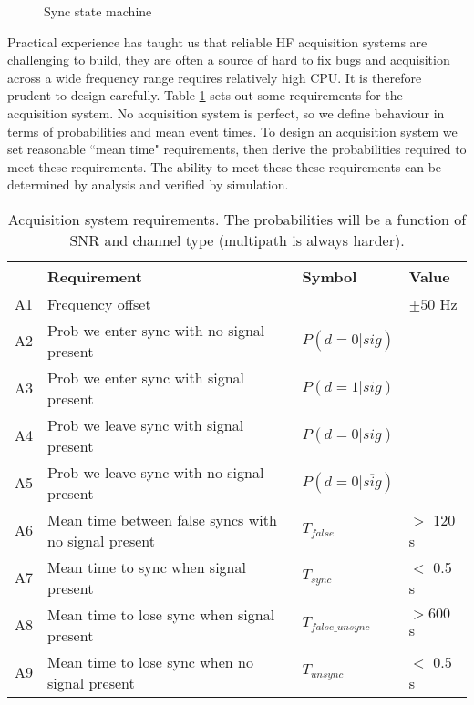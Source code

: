 \documentclass{article}
\begin{document}
\begin{figure} [H]
\caption{Sync state machine}
\vspace{5mm}
\label{fig:sync_state_mach}
\begin{center}
\end{center}
\end{figure}

Practical experience has taught us that reliable HF acquisition systems are challenging to build, they are often a source of hard to fix bugs and acquisition across a wide frequency range requires relatively high CPU.  It is therefore prudent to design carefully.  Table \ref{tab:acq_req} sets out some requirements for the acquisition system. No acquisition system is perfect, so we define behaviour in terms of probabilities and mean event times.  To design an acquisition system we set reasonable ``mean time" requirements, then derive the probabilities required to meet these requirements.  The ability to meet these these requirements can be determined by analysis and verified by simulation.

\begin{table} [H]
\centering
\begin{tabular}{ m{0.3cm} | m{6.5cm} | m{2.1cm} | m{1.25cm}}
 \hline
  & Requirement & Symbol & Value \\
 \hline
  A1 & Frequency offset & & $\pm 50$ Hz \\
  A2 & Prob we enter sync with no signal present  & $P(d=0 | \overline{sig})$ & \\
  A3 & Prob we enter sync with signal present  & $P(d=1 | sig)$ &  \\
  A4 & Prob we leave sync with signal present  & $P(d=0 | sig)$ &  \\
  A5 & Prob we leave sync with no signal present  & $P(d=0 | \overline{sig})$ &  \\
  A6 & Mean time between false syncs with no signal present & $T_{false}$ & $>$ 120 s\\
  A7 & Mean time to sync when signal present & $T_{sync}$ & $<$ 0.5 s \\
  A8 & Mean time to lose sync when signal present & $T_{false\_unsync}$ & $>600$ s\\
  A9 & Mean time to lose sync when no signal present & $T_{unsync}$ & $<$ 0.5 s \\
 \hline
\end{tabular}
\caption{Acquisition system requirements. The probabilities will be a function of SNR and channel type (multipath is always harder).}
\label{tab:acq_req}
\end{table}
\end{document}
